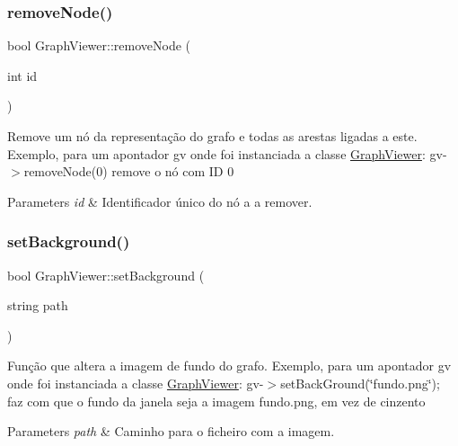 \subsubsection{\texorpdfstring{remove\+Node()}{removeNode()}}
{\footnotesize\ttfamily bool Graph\+Viewer\+::remove\+Node (\begin{DoxyParamCaption}\item[{int}]{id }\end{DoxyParamCaption})}

Remove um nó da representação do grafo e todas as arestas ligadas a este. Exemplo, para um apontador gv onde foi instanciada a classe \hyperlink{class_graph_viewer}{Graph\+Viewer}\+: gv-\/$>$remove\+Node(0) remove o nó com ID 0


\begin{DoxyParams}{Parameters}
{\em id} & Identificador único do nó a a remover. \\
\hline
\end{DoxyParams}
\hypertarget{class_graph_viewer_a02437b5fecd8b90de24436068312d593}{}\label{class_graph_viewer_a02437b5fecd8b90de24436068312d593} 
\subsubsection{\texorpdfstring{set\+Background()}{setBackground()}}
{\footnotesize\ttfamily bool Graph\+Viewer\+::set\+Background (\begin{DoxyParamCaption}\item[{string}]{path }\end{DoxyParamCaption})}

Função que altera a imagem de fundo do grafo. Exemplo, para um apontador gv onde foi instanciada a classe \hyperlink{class_graph_viewer}{Graph\+Viewer}\+: gv-\/$>$set\+Back\+Ground(\char`\"{}fundo.\+png\char`\"{}); faz com que o fundo da janela seja a imagem fundo.\+png, em vez de cinzento


\begin{DoxyParams}{Parameters}
{\em path} & Caminho para o ficheiro com a imagem. \\
\hline
\end{DoxyParams}
\hypertarget{class_graph_viewer_a07ccc96707efae4aa5f3ced3dca015af}{}\label{class_graph_viewer_a07ccc96707efae4aa5f3ced3dca015af} 
